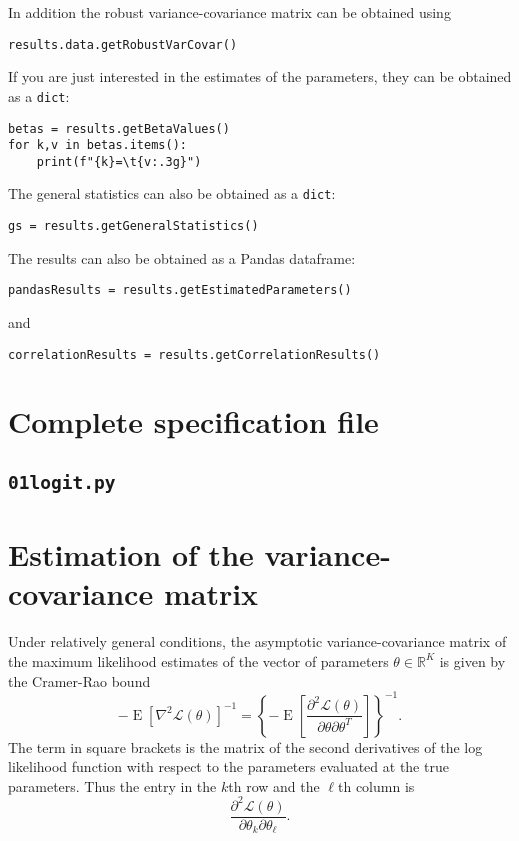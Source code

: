 \documentclass[12pt,a4paper]{article}
\newcommand{\R}{\mathbb{R}}
\renewcommand{\L}{\mathcal{L}}
\newcommand{\expect}{\operatorname{E}}
\begin{document}
In addition the robust variance-covariance matrix can be obtained
using
\begin{lstlisting}[style=nonumbers]
results.data.getRobustVarCovar()
\end{lstlisting}

If you are just interested in the estimates of the parameters, they
can be obtained as a \verb+dict+:
\begin{lstlisting}[style=nonumbers]
betas = results.getBetaValues()
for k,v in betas.items():
    print(f"{k}=\t{v:.3g}")
\end{lstlisting}

The general statistics can also be obtained as a \verb+dict+:
\begin{lstlisting}[style=nonumbers]
gs = results.getGeneralStatistics()
\end{lstlisting}


The results can also be obtained as a Pandas dataframe:
\begin{lstlisting}[style=nonumbers]
pandasResults = results.getEstimatedParameters()
\end{lstlisting}
and
\begin{lstlisting}[style=nonumbers]
correlationResults = results.getCorrelationResults()
\end{lstlisting}

\clearpage 


\appendix

\section{Complete specification file}

\subsection{\lstinline$01logit.py$}
\label{sec:modelPython}


\clearpage

   \section{Estimation of the  variance-covariance matrix}
   \label{sec:robust}
Under relatively general conditions,  the asymptotic
variance-covariance matrix of the maximum likelihood
estimates of the vector of parameters $\theta \in \R^K$ is given by the Cramer-Rao bound
\begin{equation}
  \label{eq:RaoCramer}
  -\expect\left[ \nabla^2 \L(\theta)\right]^{-1} =  \left\{-\expect\left[\frac{\partial^2 \L(\theta)}{\partial \theta \partial \theta^T}\right]\right\}^{-1}.
\end{equation}
The term in square brackets is the matrix of the second derivatives
of the log likelihood function with respect to the parameters
evaluated at the true parameters.  Thus the entry in the $k$\/th row and
the $\ell$\/th column is
\begin{equation}
  \label{eq:BAL4.34}
 \frac{\partial^2 \L(\theta)}{\partial \theta_k \partial \theta_{\ell}}.
\end{equation}
\end{document}
